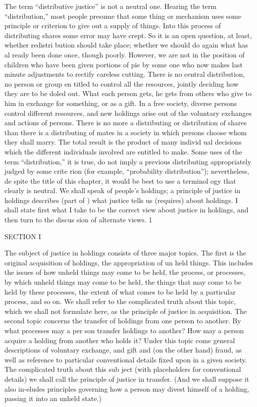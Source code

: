 \documentclass[11pt,openany]{book}
\begin{document}
The term ``distributive justice'' is not a neutral one. Hearing the term ``distribution,'' most people presume that some thing or mechanism uses some principle or criterion to give out a supply of things. Into this process of distributing shares some error may have crept. So it is an open question, at least, whether redistri bution should take place; whether we should do again what has al ready been done once, though poorly. However, we are not in the position of children who have been given portions of pie by some one who now makes last minute adjustments to rectify careless cutting. There is no central distribution, no person or group en titled to control all the resources, jointly deciding how they are to be doled out. What each person gets, he gets from others who give to him in exchange for something, or as a gift. In a free society, diverse persons control different resources, and new holdings arise out of the voluntary exchanges and actions of persons. There is no more a distributing or distribution of shares than there is a distributing of mates in a society in which persons choose whom they shall marry. The total result is the product of many individ ual decisions which the different individuals involved are entitled to make. Some uses of the term ``distribution,'' it is true, do not imply a previous distributing appropriately judged by some crite rion (for example, ``probability distribution''); nevertheless, de spite the title of this chapter, it would be best to use a terminol ogy that clearly is neutral. We shall speak of people's holdings; a principle of justice in holdings describes (part of ) what justice tells us (requires) about holdings. I shall state first what I take to be the correct view about justice in holdings, and then turn to the discus sion of alternate views. 1 

SECTION I 

The subject of justice in holdings consists of three major topics. The first is the original acquisition of holdings, the appropriation of un held things. This includes the issues of how unheld things may come to be held, the process, or processes, by which unheld things may come to be held, the things that may come to be held by these processes, the extent of what comes to be held by a particular process, and so on. We shall refer to the complicated truth about this topic, which we shall not formulate here, as the principle of justice in acquisition. The second topic concerns the transfer of holdings from one person to another. By what processes may a per son transfer holdings to another? How may a person acquire a holding from another who holds it? Under this topic come general descriptions of voluntary exchange, and gift and (on the other hand) fraud, as well as reference to particular conventional details fixed upon in a given society. The complicated truth about this sub ject (with placeholders for conventional details) we shall call the principle of justice in transfer. (And we shall suppose it also in-eludes principles governing how a person may divest himself of a holding, passing it into an unheld state.) 
\end{document}
